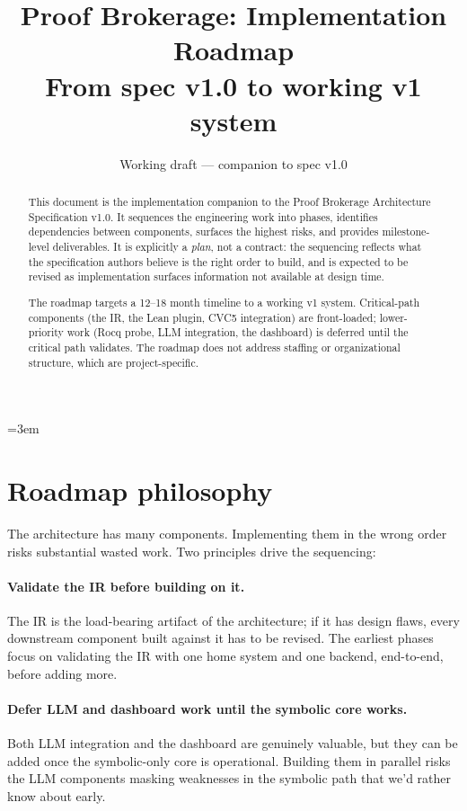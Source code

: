 \documentclass[11pt,letterpaper]{article}
\title{
  \vspace{-1cm}
  \textbf{Proof Brokerage: Implementation Roadmap}\\[0.3em]
  \large{From spec v1.0 to working v1 system}
}
\author{}
\date{Working draft --- companion to spec v1.0}
\begin{document}
\maketitle

\sloppy
\emergencystretch=3em

\begin{abstract}
\noindent
This document is the implementation companion to the Proof Brokerage
Architecture Specification v1.0. It sequences the engineering work into
phases, identifies dependencies between components, surfaces the highest
risks, and provides milestone-level deliverables. It is explicitly a
\emph{plan}, not a contract: the sequencing reflects what the
specification authors believe is the right order to build, and is
expected to be revised as implementation surfaces information not
available at design time.

The roadmap targets a 12--18 month timeline to a working v1 system.
Critical-path components (the IR, the Lean plugin, CVC5 integration)
are front-loaded; lower-priority work (Rocq probe, LLM integration, the
dashboard) is deferred until the critical path validates. The roadmap
does not address staffing or organizational structure, which are
project-specific.
\end{abstract}

\tableofcontents
\newpage

\section{Roadmap philosophy}

The architecture has many components. Implementing them in the wrong
order risks substantial wasted work. Two principles drive the
sequencing:

\paragraph{Validate the IR before building on it.} The IR is the
load-bearing artifact of the architecture; if it has design flaws, every
downstream component built against it has to be revised. The earliest
phases focus on validating the IR with one home system and one backend,
end-to-end, before adding more.

\paragraph{Defer LLM and dashboard work until the symbolic core works.}
Both LLM integration and the dashboard are genuinely valuable, but they
can be added once the symbolic-only core is operational. Building them
in parallel risks the LLM components masking weaknesses in the symbolic
path that we'd rather know about early.
\end{document}
